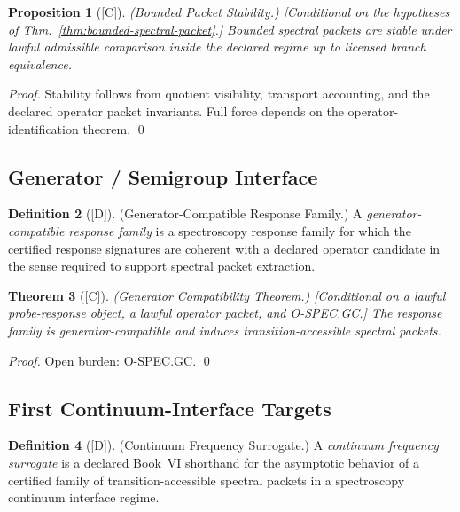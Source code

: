 \documentclass[12pt,oneside]{amsbook}
\theoremstyle{plain}
\newtheorem{theorem}{Theorem}[section]
\newtheorem{proposition}[theorem]{Proposition}
\theoremstyle{definition}
\newtheorem{definition}[theorem]{Definition}
\theoremstyle{remark}
\newcommand{\status}[1]{\textup{[#1]}}
\begin{document}
\begin{proposition}[\status{C}]\label{prop:bounded-packet-stability}
\textup{(Bounded Packet Stability.)}
\textup{[Conditional on the hypotheses of Thm.~\ref{thm:bounded-spectral-packet}.]}
Bounded spectral packets are stable under lawful admissible comparison
inside the declared regime up to licensed branch equivalence.
\end{proposition}

\begin{proof}
Stability follows from quotient visibility, transport accounting, and the
declared operator packet invariants. Full force depends on the
operator-identification theorem. \qed
\end{proof}

\subsection{Generator / Semigroup Interface}\label{sec:spec-generator}

\begin{definition}[\status{D}]\label{def:generator-compatible-family}
\textup{(Generator-Compatible Response Family.)}
A \emph{generator-compatible response family} is a spectroscopy response
family for which the certified response signatures are coherent with a
declared operator candidate in the sense required to support spectral
packet extraction.
\end{definition}

\begin{theorem}[\status{C}]\label{thm:generator-compatibility}
\textup{(Generator Compatibility Theorem.)}
\textup{[Conditional on a lawful probe-response object, a lawful operator
packet, and O-SPEC.GC.]}
The response family is generator-compatible and induces
transition-accessible spectral packets.
\end{theorem}

\begin{proof}
Open burden: \textup{O-SPEC.GC}. \qed
\end{proof}

\subsection{First Continuum-Interface Targets}\label{sec:spec-continuum-targets}

\begin{definition}[\status{D}]\label{def:continuum-frequency-surrogate}
\textup{(Continuum Frequency Surrogate.)}
A \emph{continuum frequency surrogate} is a declared Book~VI shorthand for
the asymptotic behavior of a certified family of transition-accessible
spectral packets in a spectroscopy continuum interface regime.
\end{definition}
\end{document}
